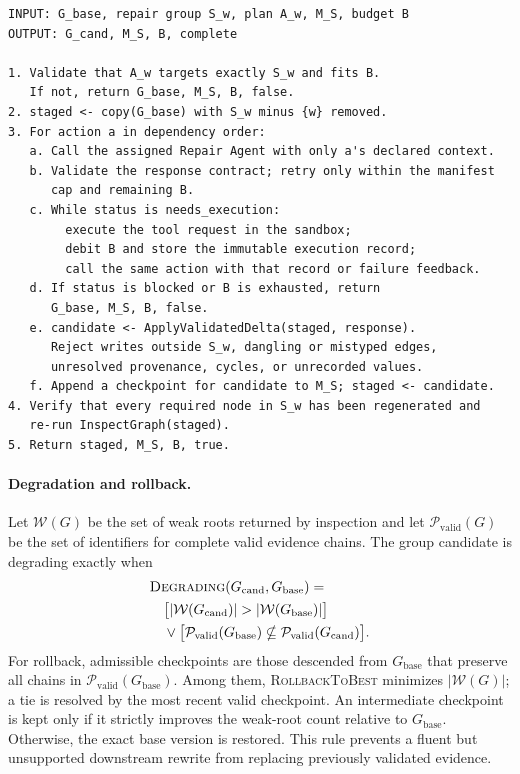 \begin{lstlisting}
INPUT: G_base, repair group S_w, plan A_w, M_S, budget B
OUTPUT: G_cand, M_S, B, complete

1. Validate that A_w targets exactly S_w and fits B.
   If not, return G_base, M_S, B, false.
2. staged <- copy(G_base) with S_w minus {w} removed.
3. For action a in dependency order:
   a. Call the assigned Repair Agent with only a's declared context.
   b. Validate the response contract; retry only within the manifest
      cap and remaining B.
   c. While status is needs_execution:
        execute the tool request in the sandbox;
        debit B and store the immutable execution record;
        call the same action with that record or failure feedback.
   d. If status is blocked or B is exhausted, return
      G_base, M_S, B, false.
   e. candidate <- ApplyValidatedDelta(staged, response).
      Reject writes outside S_w, dangling or mistyped edges,
      unresolved provenance, cycles, or unrecorded values.
   f. Append a checkpoint for candidate to M_S; staged <- candidate.
4. Verify that every required node in S_w has been regenerated and
   re-run InspectGraph(staged).
5. Return staged, M_S, B, true.
\end{lstlisting}
\promptlistingend

\paragraph{Degradation and rollback.}
Let $\mathcal{W}(G)$ be the set of weak roots returned by inspection and let
$\mathcal{P}_{\mathrm{valid}}(G)$ be the set of identifiers for complete valid
evidence chains. The group candidate is degrading exactly when
\begin{align*}
&\textsc{Degrading}(G_{\mathrm{cand}},G_{\mathrm{base}}) = {}\\
&\quad\bigl[|\mathcal{W}(G_{\mathrm{cand}})|>
       |\mathcal{W}(G_{\mathrm{base}})|\bigr] \\
&\quad{}\lor
\bigl[\mathcal{P}_{\mathrm{valid}}(G_{\mathrm{base}})
\nsubseteq
\mathcal{P}_{\mathrm{valid}}(G_{\mathrm{cand}})\bigr].
\end{align*}
For rollback, admissible checkpoints are those descended from
$G_{\mathrm{base}}$ that preserve all chains in
$\mathcal{P}_{\mathrm{valid}}(G_{\mathrm{base}})$. Among them,
\textsc{RollbackToBest} minimizes $|\mathcal{W}(G)|$; a tie is resolved by the
most recent valid checkpoint. An intermediate checkpoint is kept only if it
strictly improves the weak-root count relative to $G_{\mathrm{base}}$.
Otherwise, the exact base version is restored. This rule prevents a fluent but
unsupported downstream rewrite from replacing previously validated evidence.

